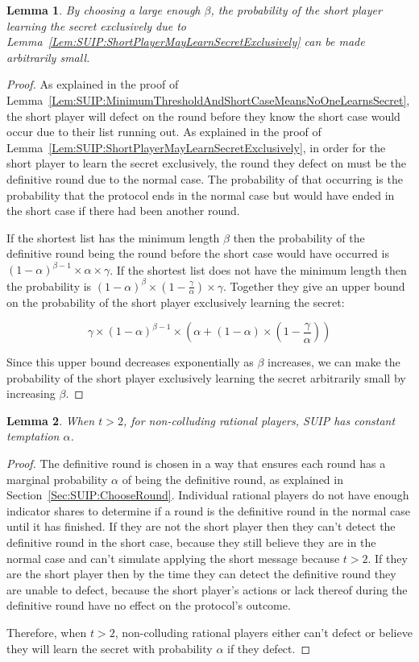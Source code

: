 \documentclass[12pt]{dalcsthesis}
\newtheorem{lemma}{Lemma}
\begin{document}
\begin{lemma}\label{Lem:SUIP:ShortPlayerLearningSecretExclusivelyIsReducible}By choosing a large enough $\beta$, the probability of the short player learning the secret exclusively due to Lemma~\ref{Lem:SUIP:ShortPlayerMayLearnSecretExclusively} can be made arbitrarily small.\end{lemma} 
\begin{proof}
As explained in the proof of Lemma~\ref{Lem:SUIP:MinimumThresholdAndShortCaseMeansNoOneLearnsSecret}, the short player will defect on the round before they know the short case would occur due to their list running out. As explained in the proof of Lemma~\ref{Lem:SUIP:ShortPlayerMayLearnSecretExclusively}, in order for the short player to learn the secret exclusively, the round they defect on must be the definitive round due to the normal case. The probability of that occurring is the probability that the protocol ends in the normal case but would have ended in the short case if there had been another round.

If the shortest list has the minimum length $\beta$ then the probability of the definitive round being the round before the short case would have occurred is $(1-\alpha)^{\beta-1} \times \alpha \times \gamma$. If the shortest list does not have the minimum length then the probability is $(1-\alpha)^\beta \times (1 - \frac{\gamma}{\alpha}) \times \gamma$. Together they give an upper bound on the probability of the short player exclusively learning the secret:

$$\gamma \times (1-\alpha)^{\beta-1} \times (\alpha + (1-\alpha) \times (1 - \frac{\gamma}{\alpha}))$$

Since this upper bound decreases exponentially as $\beta$ increases, we can make the probability of the short player exclusively learning the secret arbitrarily small by increasing $\beta$.
\end{proof}

\begin{lemma}\label{Lem:SUIP:NonColludersNotTemptedExceptT2}When $t > 2$, for non-colluding rational players, SUIP has constant temptation $\alpha$.\end{lemma}
\begin{proof}
The definitive round is chosen in a way that ensures each round has a marginal probability $\alpha$ of being the definitive round, as explained in Section~\ref{Sec:SUIP:ChooseRound}. Individual rational players do not have enough indicator shares to determine if a round is the definitive round in the normal case until it has finished. If they are not the short player then they can't detect the definitive round in the short case, because they still believe they are in the normal case and can't simulate applying the short message because $t > 2$. If they are the short player then by the time they can detect the definitive round they are unable to defect, because the short player's actions or lack thereof during the definitive round have no effect on the protocol's outcome.

Therefore, when $t > 2$, non-colluding rational players either can't defect or believe they will learn the secret with probability $\alpha$ if they defect.
\end{proof}
\end{document}
